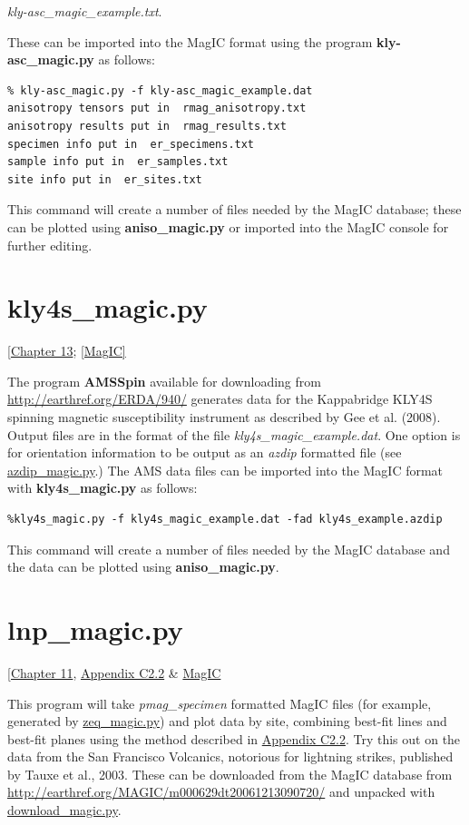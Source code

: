 \documentclass[11pt]{book}
\begin{document}
{{{{ {\it kly-asc\_magic\_example.txt}.  
 
 These can be imported into the MagIC format using the program {\bf kly-asc\_magic.py} as follows:

\begin{verbatim}
% kly-asc_magic.py -f kly-asc_magic_example.dat 
anisotropy tensors put in  rmag_anisotropy.txt
anisotropy results put in  rmag_results.txt
specimen info put in  er_specimens.txt
sample info put in  er_samples.txt
site info put in  er_sites.txt    
\end{verbatim}

This command will create  a number of files needed by the MagIC database; these can be plotted using {\bf aniso\_magic.py} or imported into the MagIC console for further editing.  

\section {\bf kly4s\_magic.py}[\href{http://magician.ucsd.edu/Essentials/WebBook2.html#Paleomagnetic_tensors}{Chapter 13}; 
\href{#MagIC}{[MagIC]}


The program {\bf AMSSpin} available for downloading from \url{http://earthref.org/ERDA/940/}  generates data for the Kappabridge KLY4S spinning magnetic susceptibility instrument as described by Gee et al. (2008).  \nocite{gee08}  Output files are in the format of the file {\it kly4s\_magic\_example.dat}.  One option is for orientation information to be output as an {\it azdip} formatted file (see \href{#azdip_magic.py}{azdip\_magic.py}.)   
The AMS data files can be imported into the MagIC format with {\bf kly4s\_magic.py} as follows: 

\begin{verbatim}
%kly4s_magic.py -f kly4s_magic_example.dat -fad kly4s_example.azdip
\end{verbatim}

This command will create a number of files needed by the MagIC database and the data can be plotted using {\bf aniso\_magic.py}.  

\section {\bf lnp\_magic.py}
\href{http://Webbook2.html#Fisher_statistics}{ [Chapter 11},  \href{http://Webbook2.html#linesNplanes}{Appendix C2.2} \& \href{#MagIC}{MagIC}

This program will take {\it pmag\_specimen} formatted MagIC files (for example, generated by \href{#zeq_magic.py}{zeq\_magic.py}) and plot data by site, combining best-fit lines and best-fit planes using the method described in  \href{http://Webbook2.html#linesNplanes}{Appendix C2.2}.  Try this out on the data from the San Francisco Volcanics, notorious for lightning strikes, published by Tauxe et al., 2003. \nocite{tauxe03}  These can be downloaded from the MagIC database from \url{http://earthref.org/MAGIC/m000629dt20061213090720/} and unpacked with 
\href{#download_magic.py}{download\_magic.py}.   


}}}}
\end{document}
